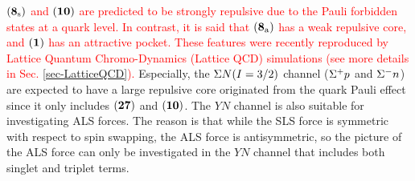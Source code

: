 \textcolor{red}{ ${\bf (8_{\rm{s}})}$ and ${\bf (10)}$ are predicted to be strongly repulsive due to the Pauli forbidden states at a quark level. In contrast, it is said that ${\bf (8_{\rm{a}})}$ has a weak repulsive core, and ${\bf (1)}$ has an attractive pocket. These features were recently reproduced by Lattice Quantum Chromo-Dynamics (Lattice QCD) simulations \cite{QCD-2019} (see more details in Sec. \ref{sec-LatticeQCD}). } Especially, the $\Sigma N(I=3/2)$ channel ($\Sigma^{+}p$ and $\Sigma^{-}n$) are expected to have a large repulsive core originated from the quark Pauli effect since it only includes ${\bf (27)}$ and ${\bf (10)}$. The $YN$ channel is also suitable for investigating ALS forces. The reason is that while the SLS force is symmetric with respect to spin swapping, the ALS force is antisymmetric, so the picture of the ALS force can only be investigated in the $YN$ channel that includes both singlet and triplet terms. 


